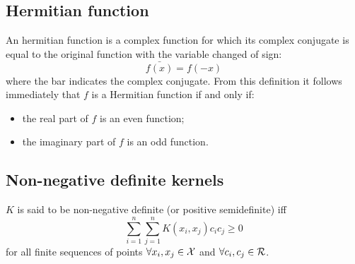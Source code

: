 \subsection{Hermitian function}
\label{Hermitian}
\begin{definition}{}
An hermitian function is a complex function for which its complex conjugate is equal to the original function with the variable changed of sign:
\begin{equation}
\bar{f(x)} = f(-x)
\end{equation}
where the bar indicates the complex conjugate.
From this definition it follows immediately that $f$ is a Hermitian function if and only if:
\begin{itemize}
\item the real part of $f$ is an even function;
\item the imaginary part of $f$ is an odd function.
\end{itemize}
\end{definition}

\subsection{Non-negative definite kernels}
\begin{definition}{}
$K$ is said to be non-negative definite (or positive semidefinite) iff
\begin{equation}
\sum _{i=1}^{n}\sum _{j=1}^{n}K(x_{i},x_{j})c_{i}c_{j}\geq 0
\end{equation}
for all finite sequences of points $\forall x_i,x_j \in \CMcal{X}$ and $\forall c_i, c_j \in \CMcal{R}$.
\end{definition}